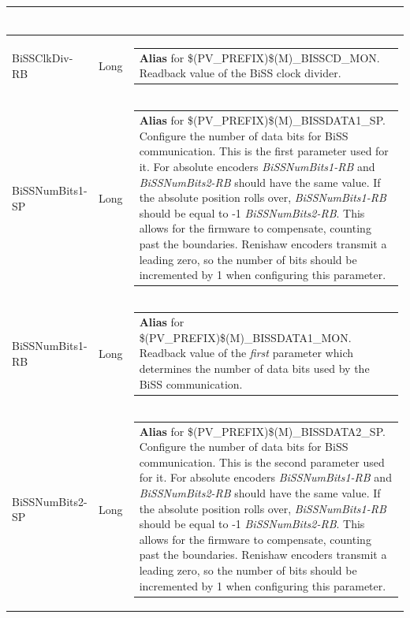 \documentclass[openany]{article}
\begin{document}
\begin{longtable}{| m{4.5cm} m{2.5cm}  m{8.5cm} |}
\begin{tabular}{@{}m{6cm}@{}}
            \end{tabular} \hypertarget{}{}\\ \hline
        BiSSClkDiv-RB & Long & \begin{tabular}{@{}m{6cm}@{}}
                \textbf{\color{blue} Alias} for \$(PV\_PREFIX)\$(M)\_BISSCD\_MON. Readback value of the BiSS clock divider.
            \end{tabular} \hypertarget{pv:biss-num-bits-1}{}\\ \hline
        BiSSNumBits1-SP & Long & \begin{tabular}{@{}m{6cm}@{}}
                \textbf{\color{blue} Alias} for \$(PV\_PREFIX)\$(M)\_BISSDATA1\_SP. Configure the number of data bits for BiSS communication. This is the first parameter used for it. For absolute encoders \emph{BiSSNumBits1-RB} and \emph{BiSSNumBits2-RB} should have the same value. If the absolute position rolls over, \emph{BiSSNumBits1-RB} should be equal to -1 $\times$ \emph{BiSSNumBits2-RB}. This allows for the firmware to compensate, counting past the boundaries. Renishaw encoders transmit a leading zero, so the number of bits should be incremented by 1 when configuring this parameter.
            \end{tabular} \hypertarget{}{}\\ \hline
        BiSSNumBits1-RB & Long & \begin{tabular}{@{}m{6cm}@{}}
                \textbf{\color{blue} Alias} for \$(PV\_PREFIX)\$(M)\_BISSDATA1\_MON. Readback value of the \emph{first} parameter which determines the number of data bits used by the BiSS communication.
            \end{tabular} \hypertarget{pv:biss-num-bits-2}{}\\ \hline
        BiSSNumBits2-SP & Long & \begin{tabular}{@{}m{6cm}@{}}
                \textbf{\color{blue} Alias} for \$(PV\_PREFIX)\$(M)\_BISSDATA2\_SP. Configure the number of data bits for BiSS communication. This is the second parameter used for it. For absolute encoders \emph{BiSSNumBits1-RB} and \emph{BiSSNumBits2-RB} should have the same value. If the absolute position rolls over, \emph{BiSSNumBits1-RB} should be equal to -1 $\times$ \emph{BiSSNumBits2-RB}. This allows for the firmware to compensate, counting past the boundaries. Renishaw encoders transmit a leading zero, so the number of bits should be incremented by 1 when configuring this parameter.
            \end{tabular} \hypertarget{}{}\\ \hline

\end{longtable}
\end{document}
